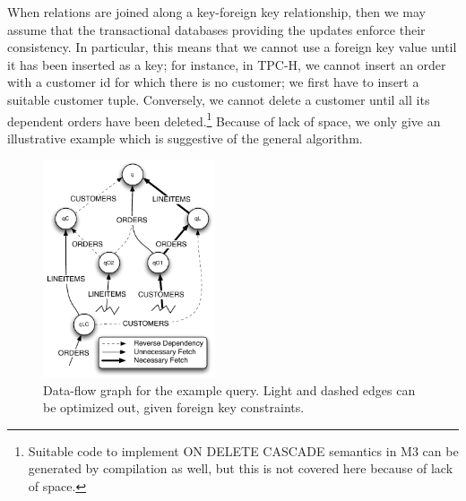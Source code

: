 When relations are joined along a key-foreign key relationship,
then we may assume that the transactional databases providing the updates
enforce their consistency. In particular, this means that we cannot use
a foreign key value until it has been inserted as a key; for instance, in
TPC-H, we cannot insert an order with a customer id for which there is
no customer; we first have to insert a suitable customer tuple.
Conversely, we cannot delete a customer until all its dependent orders
have been deleted.\footnote{Suitable code to implement ON DELETE CASCADE
semantics in M3 can be generated by compilation as well, but this is not
covered here because of lack of space.}
Because of lack of space, we only give an illustrative example which
is suggestive of the general algorithm.




\begin{figure}
\begin{center}
\includegraphics[width=2in]{images/q12_graph.pdf}
\caption{Data-flow graph for the example query.
Light and dashed edges can be optimized out, given foreign key constraints.}
\label{fig:dataflow}
\end{center}
\end{figure}


